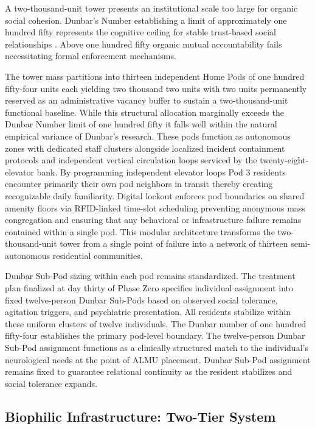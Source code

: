 \documentclass[12pt, letterpaper]{article}
\begin{document}
A two-thousand-unit tower presents an institutional scale too large for organic social cohesion. Dunbar's Number establishing a limit of approximately one hundred fifty represents the cognitive ceiling for stable trust-based social relationships \citep{dunbar_1992}. Above one hundred fifty organic mutual accountability fails necessitating formal enforcement mechanisms.

The tower mass partitions into thirteen independent Home Pods of one hundred fifty-four units each yielding two thousand two units with two units permanently reserved as an administrative vacancy buffer to sustain a two-thousand-unit functional baseline. While this structural allocation marginally exceeds the Dunbar Number limit of one hundred fifty it falls well within the natural empirical variance of Dunbar's research. These pods function as autonomous zones with dedicated staff clusters alongside localized incident containment protocols and independent vertical circulation loops serviced by the twenty-eight-elevator bank. By programming independent elevator loops Pod 3 residents encounter primarily their own pod neighbors in transit thereby creating recognizable daily familiarity. Digital lockout enforces pod boundaries on shared amenity floors via RFID-linked time-slot scheduling preventing anonymous mass congregation and ensuring that any behavioral or infrastructure failure remains contained within a single pod. This modular architecture transforms the two-thousand-unit tower from a single point of failure into a network of thirteen semi-autonomous residential communities.

Dunbar Sub-Pod sizing within each pod remains standardized. The treatment plan finalized at day thirty of Phase Zero specifies individual assignment into fixed twelve-person Dunbar Sub-Pods based on observed social tolerance, agitation triggers, and psychiatric presentation. All residents stabilize within these uniform clusters of twelve individuals. The Dunbar number of one hundred fifty-four establishes the primary pod-level boundary. The twelve-person Dunbar Sub-Pod assignment functions as a clinically structured match to the individual's neurological needs at the point of ALMU placement. Dunbar Sub-Pod assignment remains fixed to guarantee relational continuity as the resident stabilizes and social tolerance expands.

\subsection{Biophilic Infrastructure: Two-Tier System}
\end{document}
